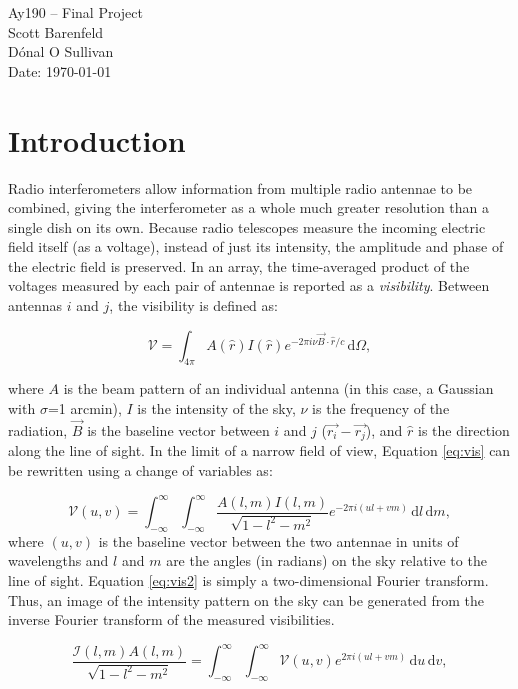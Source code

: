\documentclass[11pt,letterpaper]{article}
\begin{document}
\begin{center}
\Large
Ay190 -- Final Project\\
Scott Barenfeld\\
D\'{o}nal O Sullivan\\
Date: \today
\end{center}

\section{Introduction}
Radio interferometers allow information from multiple radio antennae to be 
combined, giving the interferometer as a whole much greater resolution than 
a single dish on its own.  Because radio telescopes measure the incoming 
electric field itself (as a voltage), instead of just its intensity, the 
amplitude and phase of the electric field is preserved.  In an array, the 
time-averaged product of the voltages measured by each pair of antennae is 
reported as a \emph{visibility}.  Between antennas $i$ and $j$, the 
visibility is defined as:

\begin{equation}\label{eq:vis}
\mathcal{V}=\int_{4\pi} \! A(\hat{r})I(\hat{r})e^{-2\pi i\nu\vec{B}\cdot\hat{r}/c} \, \mathrm{d}\Omega,
\end{equation} 

where $A$ is the beam pattern of an individual antenna (in this case, a Gaussian 
with $\sigma$=1 arcmin), $I$ is the intensity 
of the sky, $\nu$ is the frequency of the radiation, $\vec{B}$ is the baseline 
vector between $i$ and $j$ ($\vec{r_i}-\vec{r_j}$), and $\hat{r}$ is the 
direction along the line of sight.  In the limit of a narrow field of view, 
Equation \ref{eq:vis} can be rewritten using a change of variables as: 

\begin{equation}\label{eq:vis2}
\mathcal{V}(u,v)=\int_{-\infty}^{\infty} \! \int_{-\infty}^{\infty} \! \frac{A(l,m)I(l,m)}{\sqrt{1-l^2-m^2}}e^{-2\pi i(ul+vm)} \, \mathrm{d}l \, \mathrm{d}m,
\end{equation}
where $(u,v)$ is the baseline vector between the two antennae in units of 
wavelengths and $l$ and $m$ are the angles (in radians) on the sky relative 
to the line of sight.  Equation \ref{eq:vis2} is simply a two-dimensional 
Fourier transform.  Thus, an image of the intensity pattern on the sky can 
be generated from the inverse Fourier transform of the measured visibilities.

\begin{equation}\label{eq:vis3}
\frac{\mathcal{I}(l,m)A(l,m)}{\sqrt{1-l^2-m^2}}=\int_{-\infty}^{\infty} \! \int_{-\infty}^{\infty} \! \mathcal{V}(u,v)e^{2\pi i(ul+vm)} \, \mathrm{d}u \, \mathrm{d}v,
\end{equation}  
\end{document}
